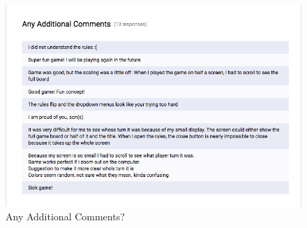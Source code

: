 \documentclass[12pt, titlepage]{article}
\begin{document}
\begin{itemize}
\begin{figure}[H]
\centering
\includegraphics[width=0.9\linewidth]{../../ReferenceMaterial/Survey_Results/Survey_Question_13}
\caption{Any Additional Comments?}
\end{figure}

\end{itemize}
		
\end{document}
